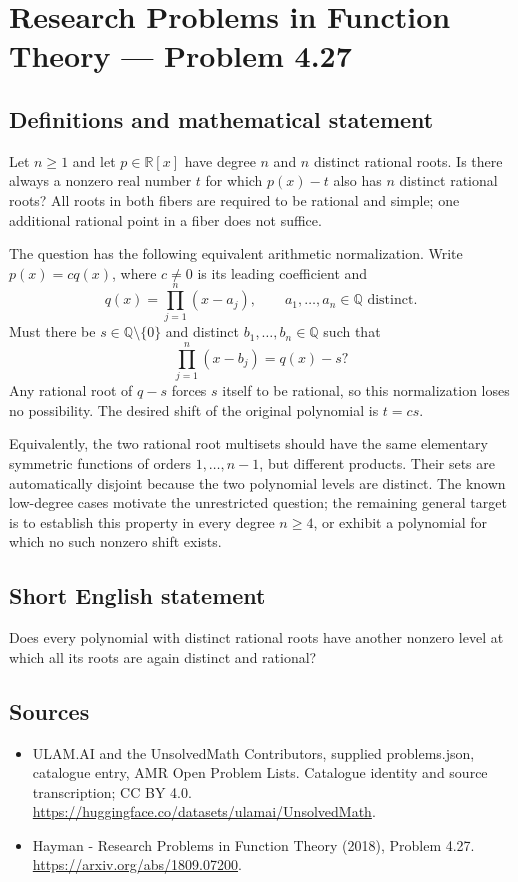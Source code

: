 \documentclass[11pt,a4paper]{article}
\begin{document}
\section*{Research Problems in Function Theory — Problem 4.27}\label{statement}

\subsection{Definitions and mathematical statement}
Let $n\geq1$ and let $p\in\mathbb R[x]$ have degree $n$ and
$n$ distinct rational roots. Is there always a nonzero real
number $t$ for which $p(x)-t$ also has $n$ distinct rational roots?
All roots in both fibers are required to be rational and simple;
one additional rational point in a fiber does not suffice.

The question has the following equivalent arithmetic normalization.
Write $p(x)=c q(x)$, where $c\ne0$ is its leading coefficient and
\[
 q(x)=\prod_{j=1}^{n}(x-a_j),\qquad
 a_1,\ldots,a_n\in\mathbb Q\text{ distinct}.
\]
Must there be $s\in\mathbb Q\setminus\{0\}$ and distinct
$b_1,\ldots,b_n\in\mathbb Q$ such that
\[
 \prod_{j=1}^{n}(x-b_j)=q(x)-s?
\]
Any rational root of $q-s$ forces $s$ itself to be rational,
so this normalization loses no possibility. The desired shift
of the original polynomial is $t=cs$.

Equivalently, the two rational root multisets should have the
same elementary symmetric functions of orders $1,\ldots,n-1$,
but different products. Their sets are automatically disjoint
because the two polynomial levels are distinct. The known
low-degree cases motivate the unrestricted question; the
remaining general target is to establish this property in every
degree $n\geq4$, or exhibit a polynomial for which no such
nonzero shift exists.
\subsection{Short English statement}
Does every polynomial with distinct rational roots have another nonzero level at which all its roots are again distinct and rational?
\subsection{Sources}
\begin{itemize}
\item[S1] ULAM.AI and the UnsolvedMath Contributors, supplied problems.json, catalogue entry, AMR Open Problem Lists. Catalogue identity and source transcription; CC BY 4.0.
\url{https://huggingface.co/datasets/ulamai/UnsolvedMath}.
\item[S2] Hayman - Research Problems in Function Theory (2018), Problem 4.27. 
\url{https://arxiv.org/abs/1809.07200}.
\end{itemize}
\end{document}
